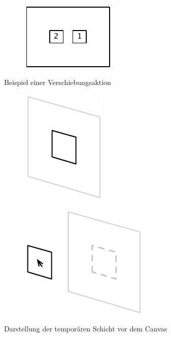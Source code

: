 \begin{figure}[hbt]
\begin{subfigure}{\subfigurewidth}
        \caption{}
        \label{fig:movement-action-example-d}
    \end{subfigure}
    \begin{subfigure}{\subfigurewidth}
        \centering
        \includegraphics[scale=\graphicsscale]{resources/movement-action-example-e}
        \caption{}
        \label{fig:movement-action-example-e}
    \end{subfigure}
    \caption{Beispiel einer Verschiebungsaktion}
    \label{fig:movement-action-example}
\end{figure}

\begin{figure}[hbt]
    \newcommand{\subfigurewidth}{0.35\textwidth}
    \newcommand{\graphicsscale}{0.95}
    \centering
    \begin{subfigure}{\subfigurewidth}
        \centering
        \includegraphics[scale=\graphicsscale]{resources/temporary-layer-visualization-a}
        \caption{}
    \end{subfigure}
    \begin{subfigure}{\subfigurewidth}
        \centering
        \includegraphics[scale=\graphicsscale]{resources/temporary-layer-visualization-b}
        \caption{}
    \end{subfigure}
    \caption{Darstellung der temporären Schicht vor dem Canvas}
    \label{fig:temporary-layer-visualization}
\end{figure}

